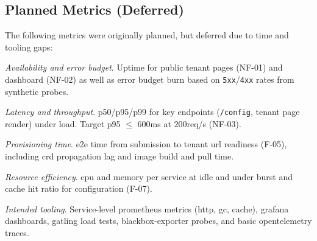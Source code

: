\documentclass[11pt, a4paper, oneside, listof=totoc]{scrartcl}
\begin{document}
        \subsection{Planned Metrics (Deferred)}\label{subsec:evalPlannedMetrics}
            The following metrics were originally planned, but deferred due to time and tooling
            gaps:
            \begin{enumerate}[label={[\arabic*]:},
                ref=Challenge~\arabic*,
                leftmargin=*,
                itemsep=0.6\baselineskip]

                \item\label{chal:plannedAvailability}
                    \textit{Availability and error budget}.
                    Uptime for public tenant pages (NF-01) and dashboard (NF-02) as well as error
                    budget burn based on \texttt{5xx}/\texttt{4xx} rates from synthetic probes.

                \item\label{chal:plannedLatency}
                    \textit{Latency and throughput}.
                    p50/p95/p99 for key endpoints (\texttt{/config}, tenant page render) under load.
                    Target p95 $\leq$ 600ms at 200req/s (NF-03).

                \item\label{chal:plannedProvisioningTime}
                    \textit{Provisioning time}.
                    \gls{e2e} time from submission to tenant \gls{url} readiness (F-05),
                    including \gls{crd} propagation lag and image build and pull time.

                \item\label{chal:plannedResourceEfficiency}
                    \textit{Resource efficiency}.
                    \gls{cpu} and memory per service at idle and under burst and cache hit ratio for
                    configuration (F-07).

                \item\label{chal:plannedTooling}
                    \textit{Intended tooling}.
                    Service-level \gls{prometheus} metrics (\gls{http}, \gls{gc}, cache), \gls{grafana}
                    dashboards, \gls{gatling} load tests, blackbox-exporter probes, and basic
                    \gls{opentelemetry} traces.
            \end{enumerate}
\end{document}

